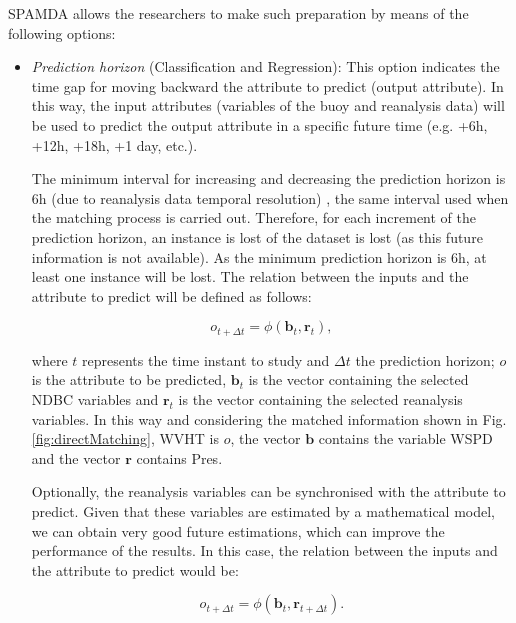 \documentclass[review]{elsarticle}
\begin{document}
				SPAMDA allows the researchers to make such preparation by means of the following options:
				
					\begin{itemize}

						\item \textit{Prediction horizon} (Classification and Regression): This option indicates the time gap for moving backward the attribute to predict (output attribute). In this way, the input attributes (variables of the buoy and reanalysis data) will be used to predict the output attribute in a specific future time (e.g. +6h, +12h, +18h, +1 day, etc.).
						
						The minimum interval for increasing and decreasing the prediction horizon is $6$h (due to reanalysis data temporal resolution) \cite{DORADOMORENO2017428}, the same interval used when the matching process is carried out. Therefore, for each increment of the prediction horizon, an instance is lost of the dataset is lost (as this future information is not available). As the minimum prediction horizon is $6$h, at least one instance will be lost. The relation between the inputs and the attribute to predict will be defined as follows:
						\begin{linenomath*}
							\begin{equation}
								o_{t+\Delta t}=\phi(\mathbf{b}_t,\mathbf{r}_{t}),
								\label{eq:noSynchronisingRD}
							\end{equation}
						\end{linenomath*}
						where $t$ represents the time instant to study and $\Delta t$ the prediction horizon; $o$ is the attribute to be predicted, $\mathbf{b}_t$ is the vector containing the selected NDBC variables and $\mathbf{r}_t$ is the vector containing the selected reanalysis variables. In this way and considering the matched information shown in Fig. \ref{fig:directMatching}, WVHT is $o$, the vector $\mathbf{b}$ contains the variable WSPD and the vector $\mathbf{r}$ contains Pres.
						
						Optionally, the reanalysis variables can be synchronised with the attribute to predict. Given that these variables are estimated by a mathematical model, we can obtain very good future estimations, which can improve the performance of the results. In this case, the relation between the inputs and the attribute to predict would be:						
						\begin{linenomath*}
							\begin{equation}
								o_{t+\Delta t}=\phi(\mathbf{b}_t,\mathbf{r}_{t+\Delta t}).
								\label{eq:synchronisingRD}
							\end{equation}
						\end{linenomath*}
						

\end{itemize}
\end{document}
